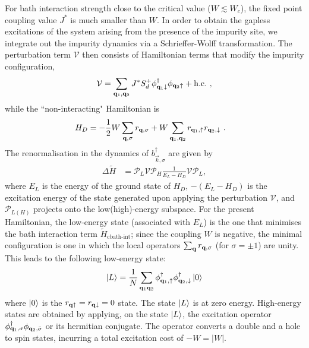 \documentclass[reprint,hidelinks,onecolumn]{revtex4-2}
\begin{document}
For bath interaction strength close to the critical value (\(W \lesssim W_c\)), the fixed point coupling value \(J^*\) is much smaller than \(W\). In order to obtain the gapless excitations of the system arising from the presence of the impurity site, we integrate out the impurity dynamics via a Schrieffer-Wolff transformation. The perturbation term \(\mathcal{V}\) then consists of Hamiltonian terms that modify the impurity configuration,
\begin{equation}\begin{aligned}
	\mathcal{V} = \sum_{{\bf q}_1, {\bf q}_2}J^*{S}_d^+{\phi}^\dagger_{{\bf q}_1 \downarrow} \phi_{{\bf q}_2 \uparrow} + \text{h.c.}~,
\end{aligned}\end{equation}
while the ``non-interacting" Hamiltonian is
\begin{equation}\begin{aligned}
	H_D &= -\frac{1}{2}W\sum_{{\bf q},\sigma}r_{{\bf q},\sigma} + W\sum_{{\bf q}_1,{\bf q}_2}r_{{\bf q}_1,\uparrow} r_{{\bf q}_2,\downarrow}~.
\end{aligned}\end{equation}
The renormalisation in the dynamics of \(b^\dagger_{\vec k,\sigma}\) are given by
\begin{equation}\begin{aligned}
	\Delta \tilde H &= \mathcal{P}_L \mathcal{V} \mathcal{P}_H\frac{1}{E_L - H_D} \mathcal{V} \mathcal{P}_L,
\end{aligned}\end{equation}
where \(E_L\) is the energy of the ground state of \(H_D\), \(-(E_L - H_D)\) is the excitation energy of the state generated upon applying the perturbation \(\mathcal{V}\), and \(\mathcal{P}_{L(H)}\) projects onto the low(high)-energy subspace. For the present Hamiltonian, the low-energy state (associated with \(E_L\)) is the one that minimises the bath interaction term \(\tilde H_\text{cbath-int}\); since the coupling \(W\) is negative, the minimal configuration is one in which the local operators \(\sum_{{\bf q}}r_{{\bf q},\sigma}\) (for \(\sigma=\pm 1\)) are unity. This leads to the following low-energy state:
\begin{equation}\begin{aligned}
	\ket{L} = \frac{1}{N}\sum_{{\bf q}_1{\bf q}_2}\phi^\dagger_{{\bf q}_1, \uparrow}\phi^\dagger_{{\bf q}_2, \downarrow} \ket{0}
\end{aligned}\end{equation}
where \(\ket{0}\) is the \(r_{{\bf q} \uparrow} = r_{{\bf q} \downarrow} = 0\) state. The state \(\ket{L}\) is at zero energy. High-energy states are obtained by applying, on the state \(\ket{L}\), the excitation operator \(\phi^\dagger_{{\bf q}_1,\sigma}\phi_{{\bf q}_2,\bar\sigma}\) or its hermitian conjugate. The operator converts a double and a hole to spin states, incurring a total excitation cost of \(-W = |W|\).
\end{document}
